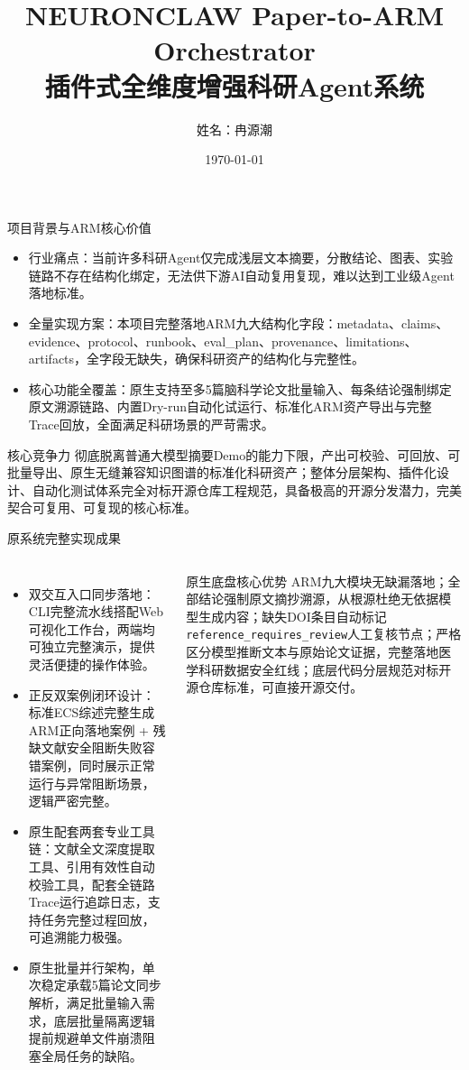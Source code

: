 ﻿\documentclass[UTF8,aspectratio=169]{ctexbeamer}
\title{NEURONCLAW Paper-to-ARM Orchestrator \\ 插件式全维度增强科研Agent系统}
\author{姓名：冉源潮}
\institute{工程化开源级全维度科研Agent系统实现}
\date{\today}
\begin{document}
\begin{frame}
  \titlepage
\end{frame}

\begin{frame}{项目背景与ARM核心价值}
  \begin{itemize}
    \item 行业痛点：当前许多科研Agent仅完成浅层文本摘要，分散结论、图表、实验链路不存在结构化绑定，无法供下游AI自动复用复现，难以达到工业级Agent落地标准。
    \item 全量实现方案：本项目完整落地ARM九大结构化字段：metadata、claims、evidence、protocol、runbook、eval\_plan、provenance、limitations、artifacts，全字段无缺失，确保科研资产的结构化与完整性。
    \item 核心功能全覆盖：原生支持至多5篇脑科学论文批量输入、每条结论强制绑定原文溯源链路、内置Dry-run自动化试运行、标准化ARM资产导出与完整Trace回放，全面满足科研场景的严苛需求。
  \end{itemize}
  \begin{block}{核心竞争力}
    彻底脱离普通大模型摘要Demo的能力下限，产出可校验、可回放、可批量导出、原生无缝兼容知识图谱的标准化科研资产；整体分层架构、插件化设计、自动化测试体系完全对标开源仓库工程规范，具备极高的开源分发潜力，完美契合可复用、可复现的核心标准。
  \end{block}
\end{frame}

\begin{frame}{原系统完整实现成果}
  \begin{columns}
    \begin{itemize}
      \item 双交互入口同步落地：CLI完整流水线搭配Web可视化工作台，两端均可独立完整演示，提供灵活便捷的操作体验。
      \item 正反双案例闭环设计：标准ECS综述完整生成ARM正向落地案例 + 残缺文献安全阻断失败容错案例，同时展示正常运行与异常阻断场景，逻辑严密完整。
      \item 原生配套两套专业工具链：文献全文深度提取工具、引用有效性自动校验工具，配套全链路Trace运行追踪日志，支持任务完整过程回放，可追溯能力极强。
      \item 原生批量并行架构，单次稳定承载5篇论文同步解析，满足批量输入需求，底层批量隔离逻辑提前规避单文件崩溃阻塞全局任务的缺陷。
    \end{itemize}
    \begin{block}{原生底盘核心优势}
      ARM九大模块无缺漏落地；全部结论强制原文摘抄溯源，从根源杜绝无依据模型生成内容；缺失DOI条目自动标记\texttt{reference\_requires\_review}人工复核节点；严格区分模型推断文本与原始论文证据，完整落地医学科研数据安全红线；底层代码分层规范对标开源仓库标准，可直接开源交付。
    \end{block}
  \end{columns}
\end{frame}
\end{document}
